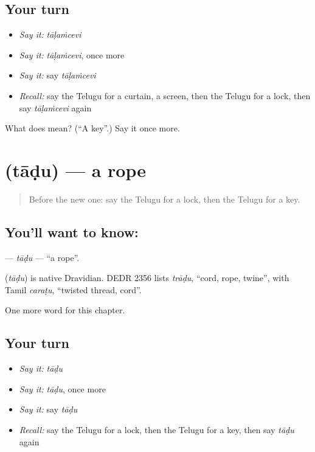 \subsection*{Your turn}
\begin{itemize}
\raggedright
  \item \emph{Say it:} \emph{tāḷaṁcevi}
  \item \emph{Say it:} \emph{tāḷaṁcevi}, once more
  \item \emph{Say it:} say \emph{tāḷaṁcevi}
  \item \emph{Recall:} say the Telugu for a curtain, a screen, then the Telugu for a lock, then say \emph{tāḷaṁcevi} again
\end{itemize}

\begin{tcolorbox}[breakable,colback=teal!4,colframe=teal!35!black,title={Before you move on}]
What does  mean? (\textquotedblleft{}A key\textquotedblright{}.) Say it once more.
\end{tcolorbox}
\section[\texorpdfstring{\te{తాడు} (tāḍu)}{తాడు (tāḍu)}]{ (tāḍu) — a rope}

\label{lesson:TE-C110-tadu}



\begin{quote}
Before the new one: say the Telugu for a lock, then the Telugu for a key.
\end{quote}

\subsection*{You'll want to know: }
\textbf{} — \emph{tāḍu} — \textquotedblleft{}a rope\textquotedblright{}.

\begin{cousinweb}
\textbf{} (\emph{tāḍu}) is native Dravidian. DEDR 2356 lists \emph{trāḍu}, \textquotedblleft{}cord, rope, twine\textquotedblright{}, with Tamil \emph{caraṭu}, \textquotedblleft{}twisted thread, cord\textquotedblright{}.
\end{cousinweb}

\begin{grammarlens}[title={What you've built}]
One more word for this chapter.
\end{grammarlens}

\subsection*{Your turn}
\begin{itemize}
\raggedright
  \item \emph{Say it:} \emph{tāḍu}
  \item \emph{Say it:} \emph{tāḍu}, once more
  \item \emph{Say it:} say \emph{tāḍu}
  \item \emph{Recall:} say the Telugu for a lock, then the Telugu for a key, then say \emph{tāḍu} again
\end{itemize}


